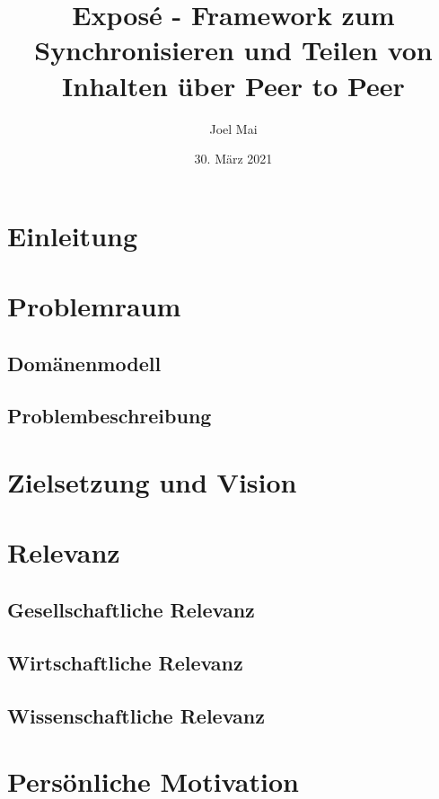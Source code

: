 \documentclass[10pt]{article}
\author{Joel Mai}
\title{Exposé - Framework zum Synchronisieren und Teilen von Inhalten über Peer to Peer}
\date{30. März 2021}
\begin{document}
    \maketitle 

    \newpage

    \section{Einleitung}\label{sec:Einleitung}

    \section{Problemraum}\label{sec:Problemraum}

        \subsection{Domänenmodell}\label{sec:Domaenenmodell}

        \subsection{Problembeschreibung}\label{sec:Problembeschreibung}

    \section{Zielsetzung und Vision}\label{sec:Zielsetzung}
    
    \section{Relevanz}\label{sec:Relevanz}
    
        \subsection{Gesellschaftliche Relevanz}\label{sec:Gesellschaftliche}
    
        \subsection{Wirtschaftliche Relevanz}\label{sec:Wirtschaftliche}
    
        \subsection{Wissenschaftliche Relevanz}\label{sec:Wissenschaftliche}
    
    \section{Persönliche Motivation}\label{sec:Motivation}
        \cite[PeerToPeer]{cobanmai2021}  

     
    
\end{document}
